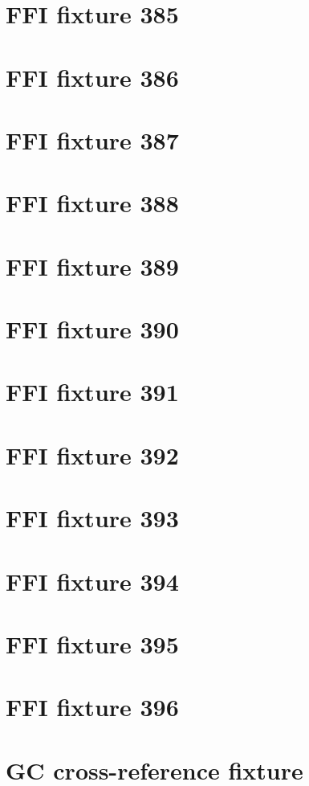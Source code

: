 \documentclass[14pt,a4paper,openany]{the-tome-of-langdev}
\begin{document}
\chapter{FFI fixture 385}\label{ch:ext-385}

\chapter{FFI fixture 386}\label{ch:ext-386}

\chapter{FFI fixture 387}\label{ch:ext-387}

\chapter{FFI fixture 388}\label{ch:ext-388}

\chapter{FFI fixture 389}\label{ch:ext-389}

\chapter{FFI fixture 390}\label{ch:ext-390}

\chapter{FFI fixture 391}\label{ch:ext-391}

\chapter{FFI fixture 392}\label{ch:ext-392}

\chapter{FFI fixture 393}\label{ch:ext-393}

\chapter{FFI fixture 394}\label{ch:ext-394}

\chapter{FFI fixture 395}\label{ch:ext-395}

\chapter{FFI fixture 396}\label{ch:ext-396}

\chapter{GC cross-reference fixture}\label{ch:ext-411}
\printbibliography
\end{document}

